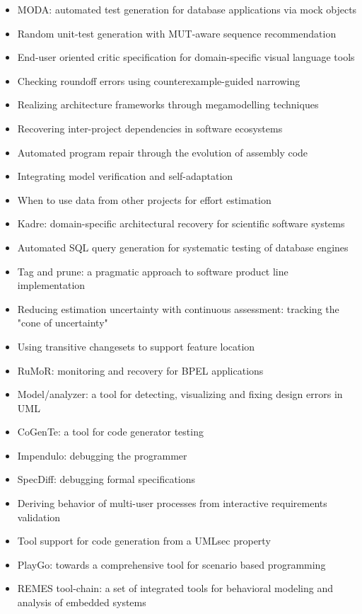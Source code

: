 {\begin{itemize}[itemsep=-1ex]
  \item MODA: automated test generation for database applications via mock objects
  \item Random unit-test generation with MUT-aware sequence recommendation
  \item End-user oriented critic specification for domain-specific visual language tools
  \item Checking roundoff errors using counterexample-guided narrowing
  \item Realizing architecture frameworks through megamodelling techniques
  \item Recovering inter-project dependencies in software ecosystems
  \item Automated program repair through the evolution of assembly code
  \item Integrating model verification and self-adaptation
  \item When to use data from other projects for effort estimation
  \item Kadre: domain-specific architectural recovery for scientific software systems
  \item Automated SQL query generation for systematic testing of database engines
  \item Tag and prune: a pragmatic approach to software product line implementation
  \item Reducing estimation uncertainty with continuous assessment: tracking the "cone of uncertainty"
  \item Using transitive changesets to support feature location
  \item RuMoR: monitoring and recovery for BPEL applications
  \item Model/analyzer: a tool for detecting, visualizing and fixing design errors in UML
  \item CoGenTe: a tool for code generator testing
  \item Impendulo: debugging the programmer
  \item SpecDiff: debugging formal specifications
  \item Deriving behavior of multi-user processes from interactive requirements validation
  \item Tool support for code generation from a UMLsec property
  \item PlayGo: towards a comprehensive tool for scenario based programming
  \item REMES tool-chain: a set of integrated tools for behavioral modeling and analysis of embedded systems

\end{itemize}}
